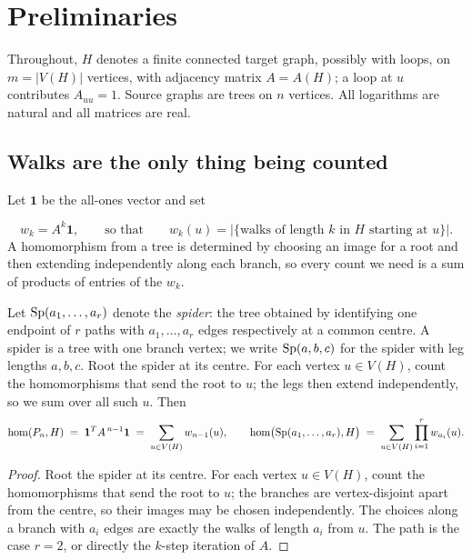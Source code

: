 \section{Preliminaries}
\label{sec:prelim}

Throughout, $H$ denotes a finite connected target graph, possibly with
loops, on $m = |V(H)|$ vertices, with adjacency matrix $A = A(H)$; a
loop at $u$ contributes $A_{uu} = 1$. Source graphs are trees on $n$
vertices. All logarithms are natural and all matrices are real.

\subsection{Walks are the only thing being counted}

Let $\mathbf{1}$ be the all-ones vector and set

\[
  w_k = A^k \mathbf{1},
  \qquad\text{so that}\qquad
  w_k(u) = \bigl|\{\text{walks of length } k \text{ in } H \text{ starting at } u\}\bigr|.
\]
A homomorphism from a tree is determined by choosing an image for a root
and then extending independently along each branch, so every count we
need is a sum of products of entries of the $w_k$.

\begin{lemma}
  \label{lem:transfer}
  Let $\operatorname{Sp}(a_1,\dots,a_r)$ denote the \emph{spider}: the tree obtained by
  identifying one endpoint of $r$ paths with $a_1, \dots, a_r$ edges
  respectively at a common centre. A spider is a tree with one branch
  vertex; we write $\operatorname{Sp}(a,b,c)$ for the spider with leg lengths $a,b,c$.
  Root the spider at its centre. For each vertex $u \in V(H)$, count the
  homomorphisms that send the root to $u$; the legs then extend
  independently, so we sum over all such $u$.
  Then
  \[
    \mathrm{hom}(P_n, H) \;=\; \mathbf{1}^{T} A^{\,n-1} \mathbf{1}
      \;=\; \sum_{u \in V(H)} w_{n-1}(u),
    \qquad
    \mathrm{hom}\bigl(\operatorname{Sp}(a_1,\dots,a_r), H\bigr)
      \;=\; \sum_{u \in V(H)} \prod_{i=1}^{r} w_{a_i}(u).
  \]
\end{lemma}

\begin{proof}
  Root the spider at its centre. For each vertex $u \in V(H)$, count the
  homomorphisms that send the root to $u$; the branches are vertex-disjoint
  apart from the centre, so their images may be chosen independently. The
  choices along a branch with $a_i$ edges are exactly the walks of length
  $a_i$ from $u$. The path is the case $r = 2$, or directly the $k$-step
  iteration of $A$.
\end{proof}

